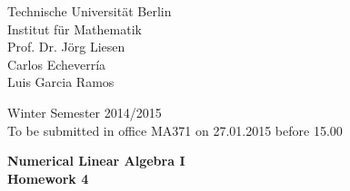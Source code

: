 \documentclass[10pt]{report}
\begin{document}
\begin{minipage}[t]{0.58\textwidth}
Technische Universit\"at Berlin\\
Institut f\"ur Mathematik\\
Prof. Dr. J\"org Liesen\\
Carlos Echeverr\'ia\\
Luis Garcia Ramos
\end{minipage}
\hfill
\begin{minipage}[t]{0.48\textwidth}
\begin{flushright}
Winter Semester 2014/2015\\
To be submitted in office MA371 on 27.01.2015 before 15.00
\end{flushright}
\end{minipage}
\begin{center}
\textbf{{Numerical Linear Algebra I}}\\
\textbf{Homework 4}
\end{center}
\thispagestyle{empty}
\vspace{0cm}
\end{document}
